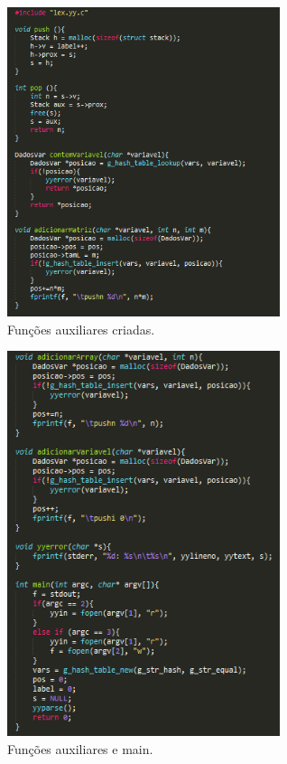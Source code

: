 \documentclass{report}
\begin{document}
\begin{figure}[ht]
\centering
\includegraphics[width=80mm, scale=0.5]{gt4.png}
\caption{\label{fig:change}Funções auxiliares criadas.}
\end{figure}

\begin{figure}[ht]
\centering
\includegraphics[width=80mm, scale=0.5]{gt5.png}
\caption{\label{fig:change}Funções auxiliares e main.}
\end{figure}
\end{document}

